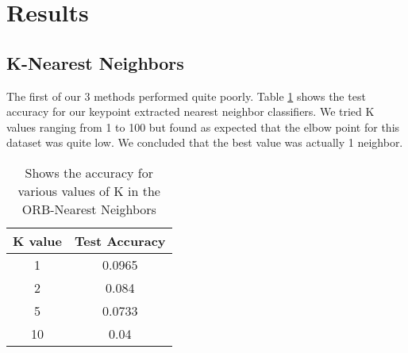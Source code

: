 \section{Results}

\subsection{K-Nearest Neighbors}

The first of our 3 methods performed quite poorly. Table \ref{fig:knn} shows the test accuracy for our keypoint extracted nearest neighbor classifiers. We tried K values ranging from 1 to 100 but found as expected that the elbow point for this dataset was quite low. We concluded that the best value was actually 1 neighbor.
\begin{table}[h!]
\centering
\begin{tabular}{|c|c|}\hline
	\textbf{K value} & \textbf{Test Accuracy}\\ \hline
	 1 & 0.0965\\ \hline
	 2  & 0.084\\ \hline
	5  & 0.0733\\ \hline
	10  & 0.04\\ \hline
\end{tabular}
\caption{\label{fig:knn} Shows the accuracy for various values of K in the ORB-Nearest Neighbors}
\end{table}